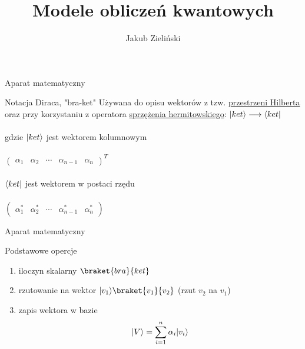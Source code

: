 \documentclass{beamer}
\title{Modele obliczeń kwantowych}
\author{Jakub Zieliński}
\institute{Wydział Elektroniki i Technik Informacyjnych\\ Politechnika Warszawska}
\date{}
\DeclarePairedDelimiter\bra{\langle}{\rvert}
\DeclarePairedDelimiter\ket{\lvert}{\rangle}
\begin{document}
	
	
	\begin{frame}
	\titlepage
	\end{frame}
	
	\begin{frame}{Aparat matematyczny}
		
		\begin{block}{Notacja Diraca, "bra-ket"}
			\vspace{0.5em}
			Używana do opisu wektorów z tzw. \href{https://en.wikipedia.org/wiki/Hilbert_space}{przestrzeni Hilberta} oraz przy korzystaniu z operatora \href{https://en.wikipedia.org/wiki/Conjugate_transpose}{sprzężenia hermitowskiego}:
			 $\ket{ket}\longrightarrow\bra{ket}$ 
			\\~\\
			gdzie $\ket{ket}$ jest wektorem kolumnowym \\~\\
			\centering
			$
			\begin{pmatrix}
			\alpha_{1} &\alpha_{2} & \cdots &\alpha_{n-1} &\alpha_{n} 
			\end{pmatrix}
			^{T}
			$\\~\\
			\flushleft
			$\bra{ket}$ jest wektorem w postaci rzędu\\~\\ 
			\centering
			$
			\begin{pmatrix}
			\alpha_{1}^{\ast} &\alpha_{2}^{\ast} & \cdots &\alpha_{n-1}^{\ast} &\alpha_{n}^{\ast} 
			\end{pmatrix}
			$
			\vspace{0.5em}
		\end{block}
	\end{frame}	

	\begin{frame}{Aparat matematyczny}
		\begin{block}{Podstawowe opercje}
			\vspace{0.5em}
			\begin{enumerate}
				\item iloczyn skalarny $\braket{bra}{ket}$
				\item rzutowanie na wektor $\ket{v_{1}}\braket{v_{1}}{v_{2}}$ (rzut $v_{2}$ na $v_{1}$)
				\item zapis wektora w bazie $$\ket{V} = \sum\limits_{i=1}^n \alpha_{i}\ket{v_{i}}$$
			\end{enumerate}	
			\vspace{0.5em}
		\end{block}
	\end{frame}
	
\end{document}
